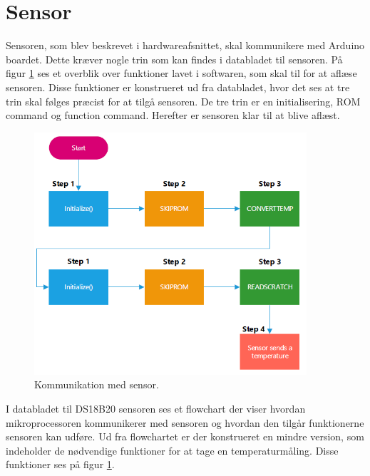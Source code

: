 \newpage
\section{Sensor}
Sensoren, som blev beskrevet i hardwareafsnittet, skal kommunikere med Arduino boardet. Dette kræver nogle trin som kan findes i databladet til sensoren. På figur \ref{sensor_min} ses et overblik over funktioner lavet i softwaren, som skal til for at aflæse sensoren. Disse funktioner er konstrueret ud fra databladet, hvor det ses at tre trin skal følges præcist for at tilgå sensoren. De tre trin er en initialisering, ROM command og function command. Herefter er sensoren klar til at blive aflæst.


\begin{figure}[h!]
  \centering
  \includegraphics[width=0.9\textwidth]{figures/sensor_minimum.png}
  \caption{Kommunikation med sensor.}
  \label{sensor_min}
\end{figure}

I databladet til DS18B20 sensoren ses et flowchart der viser hvordan mikroprocessoren kommunikerer med sensoren og hvordan den tilgår funktionerne  sensoren kan udføre. Ud fra flowchartet er der konstrueret en mindre version, som indeholder de nødvendige funktioner for at tage en temperaturmåling. Disse funktioner ses på figur \ref{sensor_min}.


\newpage
